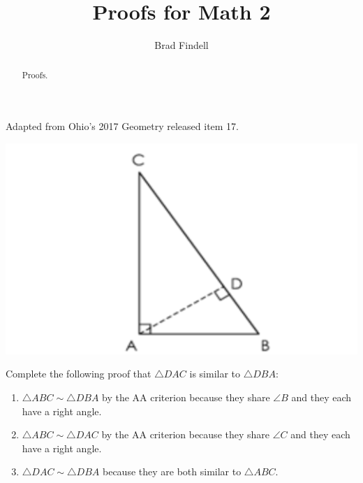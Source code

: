 \documentclass[nooutcomes]{ximera}
\title{Proofs for Math 2}
\author{Brad Findell}
\begin{document}
\begin{abstract}
Proofs. 
\end{abstract}
\maketitle


\begin{problem}
Adapted from Ohio's 2017 Geometry released item 17. 

\begin{image}
\includegraphics{Q17.png}
\end{image}
Complete the following proof that $\triangle DAC$ is similar to $\triangle DBA$: 

\begin{enumerate}
\item $\triangle ABC\sim \triangle DBA$ by the AA criterion because they share $\angle B$ and they each have a right angle. 

\item $\triangle ABC\sim \triangle DAC$ by the AA criterion because they share $\angle C$ and they each have a right angle. 

\item $\triangle DAC\sim \triangle DBA$ because they are both similar to
$\triangle ABC$.
\end{enumerate}
\end{problem}
\end{document}
